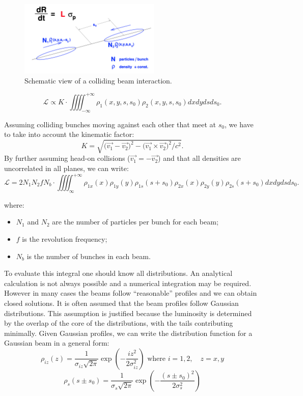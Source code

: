 \begin{figure}
    \centering
    \includegraphics[width=0.6\textwidth]{figures/luminosity_def.png}
    \caption{Schematic view of a colliding beam interaction.}
    \label{fig:lumi-def}
\end{figure}

\begin{equation}
    \mathcal{L} \propto K\cdot\iiiint_{-\infty}^{+\infty}\rho_1(x,y,s,s_0)\rho_2(x,y,s,s_0)dxdydsds_0.\label{lumi_propto}
\end{equation}

Assuming colliding bunches moving against each other that meet at $s_0$, we have to take into account the kinematic factor\cite{Moller}:
\begin{equation}
    K = \sqrt{\bigl(\vec{v_1}-\vec{v_2}\bigr)^2-\bigl(\vec{v_1} \times \vec{v_2}\bigr)^2/c^2}.
\end{equation}
By further assuming head-on collisions ($\vec{v_1}=-\vec{v_2}$) and that all densities are uncorrelated in all planes, we can write:
\begin{equation}
        \mathcal{L} = 2 N_1 N_2 f N_b\cdot\iiiint_{\infty}^{+\infty}\rho_{1x}(x)\rho_{1y}(y)\rho_{1s}(s+s_0)\rho_{2x}(x)\rho_{2y}(y)\rho_{2s}(s+s_0)dxdydsds_0.\label{beam_overlap}
\end{equation}

where:
\begin{itemize}
    \item $ N_1$  and $N_2$  are the number of particles per bunch for each beam;
    \item $f$ is the revolution frequency;
    \item $N_b$  is the number of bunches in each beam.
\end{itemize}

To evaluate this integral one should know all distributions. An analytical calculation is not always possible and a numerical integration may be required. However in many cases the beams follow ``reasonable” profiles and we can obtain closed solutions. It is often assumed that the beam profiles follow Gaussian distributions. This assumption is justified because the luminosity is determined by the overlap of the core of the distributions, with the tails contributing minimally.
Given Gaussian profiles, we can write the distribution function for a Gaussian beam in a general form:
\begin{equation}
\rho_{iz}(z) =\frac{1}{\sigma_{iz}\sqrt{2\pi}} \exp\left( -\frac{iz^2}{2 \sigma_{iz}^2} \right) \text{ where } i=1,2, \quad z=x,y
\end{equation}
\begin{equation}
\rho_{s}(s\pm s_0) =\frac{1}{\sigma_s\sqrt{2\pi}} \exp\left( -\frac{(s\pm s_0)^2}{2 \sigma_s^2} \right)
\end{equation}

